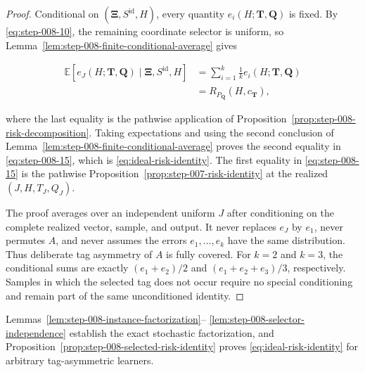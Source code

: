 \begin{proof}
Conditional on \((\boldsymbol\Xi,S^{\mathrm{id}},H)\), every quantity
\(e_i(H;\boldsymbol T,\boldsymbol Q)\) is fixed. By \eqref{eq:step-008-10}, the remaining
coordinate selector is uniform, so
Lemma~\ref{lem:step-008-finite-conditional-average} gives

\[
\begin{aligned}
\mathbb E\!\left[
e_J(H;\boldsymbol T,\boldsymbol Q)
\mid\boldsymbol\Xi,S^{\mathrm{id}},H
\right]
&=\sum_{i=1}^k\frac1k
  e_i(H;\boldsymbol T,\boldsymbol Q)\\
&=R_{P_{\boldsymbol Q}}(H,c_{\boldsymbol T}),
\end{aligned}
\]

where the last equality is the pathwise application of
Proposition~\ref{prop:step-008-risk-decomposition}. Taking expectations and
using the second conclusion of
Lemma~\ref{lem:step-008-finite-conditional-average} proves
the second equality in \eqref{eq:step-008-15}, which is \eqref{eq:ideal-risk-identity}. The first equality in \eqref{eq:step-008-15} is the
pathwise Proposition~\ref{prop:step-007-risk-identity} at the realized
\((J,H,T_J,Q_J)\).

The proof averages over an independent uniform \(J\) after conditioning on
the complete realized vector, sample, and output. It never replaces
\(e_J\) by \(e_1\), never permutes \(A\), and never assumes the errors
\(e_1,\ldots,e_k\) have the same distribution. Thus deliberate tag
asymmetry of \(A\) is fully covered. For \(k=2\) and \(k=3\), the
conditional sums are exactly \((e_1+e_2)/2\) and
\((e_1+e_2+e_3)/3\), respectively. Samples in which the selected tag does
not occur require no special conditioning and remain part of the same
unconditioned identity. \end{proof}
Lemmas~\ref{lem:step-008-instance-factorization}--
\ref{lem:step-008-selector-independence} establish the exact stochastic
factorization, and
Proposition~\ref{prop:step-008-selected-risk-identity} proves
\eqref{eq:ideal-risk-identity} for arbitrary tag-asymmetric learners.

